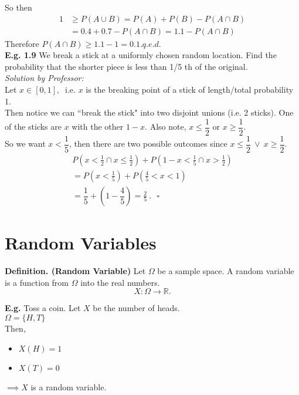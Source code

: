 \documentclass[12pt]{book}
\begin{document}
\noindent So then
\begin{align*}
1 &\geq P(A\cup B ) = P(A)+ P(B) - P(A\cap B)\\
&= 0.4+0.7-P(A\cap B)=1.1-P(A\cap B)
\end{align*}
Therefore $P(A\cap B) \geq 1.1-1 = 0.1$.\hfill $q.e.d.$\\

\noindent \textbf{E.g. 1.9} We break a stick at a uniformly chosen random location. Find the probability that the shorter piece is less than 1/5 th of the original.\\

\noindent \textit{Solution by Professor:}\\
Let $x\in [0,1],~$ i.e. $x$ is the breaking point of a stick of length/total probability 1.\\
Then notice we can ``break the stick" into two disjoint unions (i.e. 2 sticks). One of the sticks are $x$ with the other $1-x$. Also note, $x\leq \dfrac{1}{2}$ or $x \geq \dfrac{1}{2}$.\\

\noindent So we want $x< \dfrac{1}{5}$, then there are two possible outcomes since $x\leq \dfrac{1}{2}~\lor~x\geq \dfrac{1}{2}$.
\newpage
\begin{align*}
P(x<\frac{1}{2} \cap x\leq \frac{1}{2})+P(1-x < \frac{1}{5} \cap x>\frac{1}{2})\\
= P(x<\frac{1}{5})+ P(\frac{4}{5}<x<1)\\
=\dfrac{1}{5}+(1-\dfrac{4}{5})=\boxed{\frac{2}{5}}~.~~~\square
\end{align*}




\section{Random Variables}
\textbf{Definition. (Random Variable)} Let $\Omega$ be a sample space. A random variable is a function from $\Omega$ into the real numbers.
$$X:\Omega \rightarrow \mathbb{R}.$$

\noindent \textbf{E.g.} Toss a coin. Let $X$ be the number of heads. \\
$\Omega=\{H,T\}$\\
Then, 
\begin{itemize}
\item $X(H)=1$
\item $X(T)=0$
\end{itemize}
$\implies X$ is a random variable.
\end{document}
